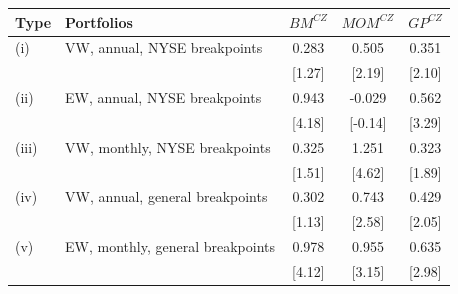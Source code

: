 \begin{tabular}{llccc}
\toprule
Type & Portfolios & $BM^{CZ}$ & $MOM^{CZ}$ & $GP^{CZ}$ \\
\midrule
(i) & VW, annual, NYSE breakpoints & 0.283 & 0.505 & 0.351 \\
 &  & [1.27] & [2.19] & [2.10] \\
(ii) & EW, annual, NYSE breakpoints & 0.943 & -0.029 & 0.562 \\
 &  & [4.18] & [-0.14] & [3.29] \\
(iii) & VW, monthly, NYSE breakpoints & 0.325 & 1.251 & 0.323 \\
 &  & [1.51] & [4.62] & [1.89] \\
(iv) & VW, annual, general breakpoints & 0.302 & 0.743 & 0.429 \\
 &  & [1.13] & [2.58] & [2.05] \\
(v) & EW, monthly, general breakpoints & 0.978 & 0.955 & 0.635 \\
 &  & [4.12] & [3.15] & [2.98] \\
\bottomrule
\end{tabular}
